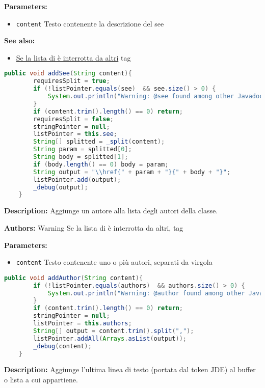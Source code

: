 \documentclass{article}
\begin{document}
\textbf{Parameters:}
\begin{itemize}
  \item\texttt{content} Testo contenente la descrizione del see  
\end{itemize}

\textbf{See also:}
\begin{itemize}
  \item\href{Warning}{Se la lista di è interrotta da altri} tag
\end{itemize}

\begin{lstlisting}[language=Java]
    public void addSee(String content){
        requiresSplit = true;
        if (!listPointer.equals(see)  && see.size() > 0) {
            System.out.println("Warning: @see found among other Javadoc keywords. You should put all @see together.");
        }
        if (content.trim().length() == 0) return;
        requiresSplit = false;
        stringPointer = null;
        listPointer = this.see;
        String[] splitted = _split(content);
        String param = splitted[0];
        String body = splitted[1];
        if (body.length() == 0) body = param;
        String output = "\\href{" + param + "}{" + body + "}";
        listPointer.add(output);
        _debug(output);
    }
\end{lstlisting}
\textbf{Description:}  Aggiunge un autore alla lista degli autori della classe. 

\textbf{Authors:} Warning Se la lista di è interrotta da altri, tag

\textbf{Parameters:}
\begin{itemize}
  \item\texttt{content} Testo contenente uno o più autori, separati da virgola  
\end{itemize}

\begin{lstlisting}[language=Java]
    public void addAuthor(String content){
        if (!listPointer.equals(authors)  && authors.size() > 0) {
            System.out.println("Warning: @author found among other Javadoc keywords. You should put all authors together.");
        }
        if (content.trim().length() == 0) return;
        stringPointer = null;
        listPointer = this.authors;
        String[] output = content.trim().split(",");
        listPointer.addAll(Arrays.asList(output));
        _debug(content);
    }
\end{lstlisting}
\textbf{Description:}  Aggiunge l'ultima linea di testo (portata dal token JDE) al buffer o lista a cui appartiene. 
\end{document}
